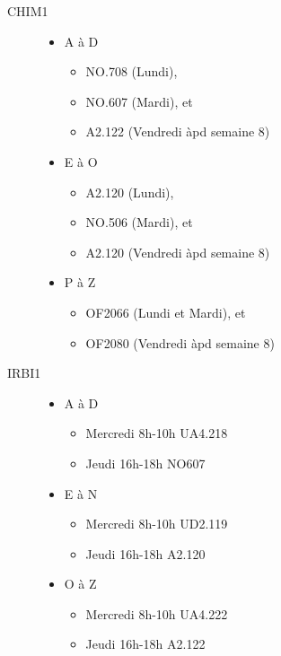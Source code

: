 \documentclass[french,xcolor=svgnames]{beamer}
\begin{document}
\begin{frame}
  \begin{description}
  \item[CHIM1]
    \begin{itemize}
    \item A à D
      \begin{itemize}
      \item NO.708 (Lundi),
      \item NO.607 (Mardi), et
      \item A2.122 (Vendredi àpd semaine 8)
      \end{itemize}
    \item E à O
      \begin{itemize}
      \item A2.120 (Lundi), 
      \item NO.506 (Mardi), et
      \item A2.120 (Vendredi àpd semaine 8)
      \end{itemize}
    \item P à Z
      \begin{itemize}
      \item OF2066 (Lundi et Mardi),  et
      \item OF2080 (Vendredi àpd semaine 8)
      \end{itemize}
    \end{itemize}
  \item[IRBI1]
    \begin{itemize}
    \item A à D
      \begin{itemize}
      \item Mercredi 8h-10h UA4.218
      \item Jeudi   16h-18h NO607
      \end{itemize}
    \item E à N
      \begin{itemize}
      \item Mercredi 8h-10h UD2.119
      \item Jeudi   16h-18h A2.120
      \end{itemize}
    \item O à Z
      \begin{itemize}
      \item Mercredi 8h-10h UA4.222
      \item Jeudi   16h-18h A2.122
      \end{itemize}
    \end{itemize}
  \end{description}
\end{frame}
\end{document}
